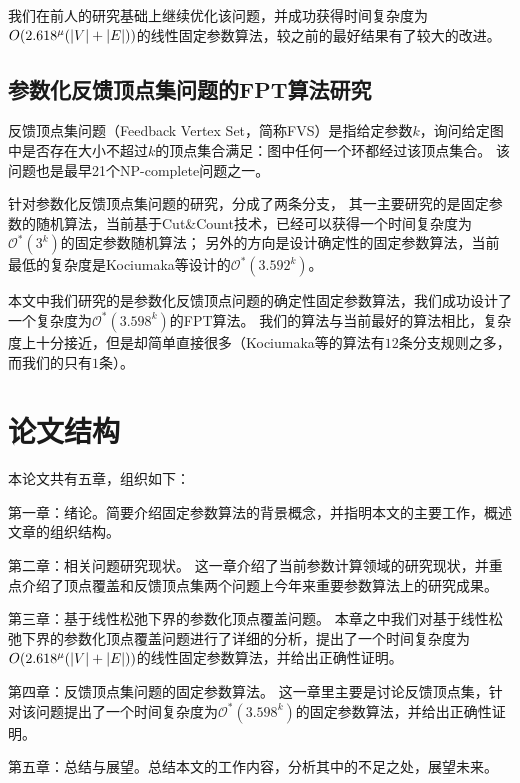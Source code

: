 我们在前人的研究基础上继续优化该问题，并成功获得时间复杂度为$O(2.618^{\mu}(\left\vert V \right\vert+\left\vert E \right\vert))$的线性固定参数算法，较之前的最好结果有了较大的改进。
\subsection{参数化反馈顶点集问题的FPT算法研究}
反馈顶点集问题（Feedback Vertex Set，简称FVS）是指给定参数$k$，询问给定图中是否存在大小不超过$k$的顶点集合满足：图中任何一个环都经过该顶点集合。
该问题也是最早21个NP-complete问题之一。

针对参数化反馈顶点集问题的研究，分成了两条分支，
其一主要研究的是固定参数的随机算法，当前基于Cut\&Count技术，已经可以获得一个时间复杂度为$\mathcal{O}^*(3^k)$的固定参数随机算法；
另外的方向是设计确定性的固定参数算法，当前最低的复杂度是Kociumaka等设计的$\mathcal{O}^*(3.592^k)$。

本文中我们研究的是参数化反馈顶点问题的确定性固定参数算法，我们成功设计了一个复杂度为$\mathcal{O}^*(3.598^k)$的FPT算法。
我们的算法与当前最好的算法相比，复杂度上十分接近，但是却简单直接很多（Kociumaka等的算法有$12$条分支规则之多，而我们的只有$1$条）。

\section{论文结构}
本论文共有五章，组织如下：

第一章：绪论。简要介绍固定参数算法的背景概念，并指明本文的主要工作，概述文章的组织结构。

第二章：相关问题研究现状。
这一章介绍了当前参数计算领域的研究现状，并重点介绍了顶点覆盖和反馈顶点集两个问题上今年来重要参数算法上的研究成果。

第三章：基于线性松弛下界的参数化顶点覆盖问题。
本章之中我们对基于线性松弛下界的参数化顶点覆盖问题进行了详细的分析，提出了一个时间复杂度为$O(2.618^{\mu}(\left\vert V \right\vert+\left\vert E \right\vert))$的线性固定参数算法，并给出正确性证明。

第四章：反馈顶点集问题的固定参数算法。
这一章里主要是讨论反馈顶点集，针对该问题提出了一个时间复杂度为$\mathcal{O}^*(3.598^k)$的固定参数算法，并给出正确性证明。

第五章：总结与展望。总结本文的工作内容，分析其中的不足之处，展望未来。
